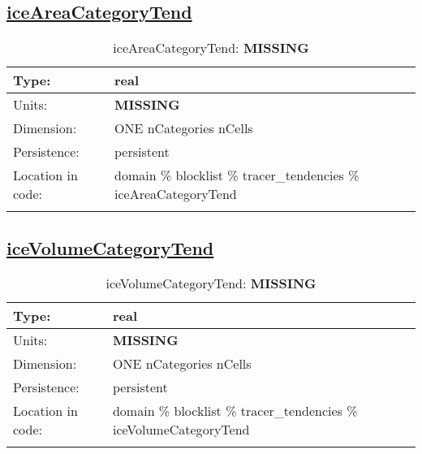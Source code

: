 \subsection[iceAreaCategoryTend]{\hyperref[sec:var_tab_tracer_tendencies]{iceAreaCategoryTend}}
\label{subsec:var_sec_tracer_tendencies_iceAreaCategoryTend}
\begin{center}
\begin{longtable}{| p{2.0in} | p{4.0in} |}
        \hline 
        Type: & real \\
        \hline 
        Units: & {\bf \color{red} MISSING} \\
        \hline 
        Dimension: & ONE nCategories nCells \\
        \hline 
        Persistence: & persistent \\
        \hline 
         Location in code: & domain \% blocklist \% tracer\_tendencies \% iceAreaCategoryTend \\
         \hline 
    \caption{iceAreaCategoryTend: {\bf \color{red} MISSING}}
\end{longtable}
\end{center}
\subsection[iceVolumeCategoryTend]{\hyperref[sec:var_tab_tracer_tendencies]{iceVolumeCategoryTend}}
\label{subsec:var_sec_tracer_tendencies_iceVolumeCategoryTend}
\begin{center}
\begin{longtable}{| p{2.0in} | p{4.0in} |}
        \hline 
        Type: & real \\
        \hline 
        Units: & {\bf \color{red} MISSING} \\
        \hline 
        Dimension: & ONE nCategories nCells \\
        \hline 
        Persistence: & persistent \\
        \hline 
         Location in code: & domain \% blocklist \% tracer\_tendencies \% iceVolumeCategoryTend \\
         \hline 
    \caption{iceVolumeCategoryTend: {\bf \color{red} MISSING}}
\end{longtable}
\end{center}
